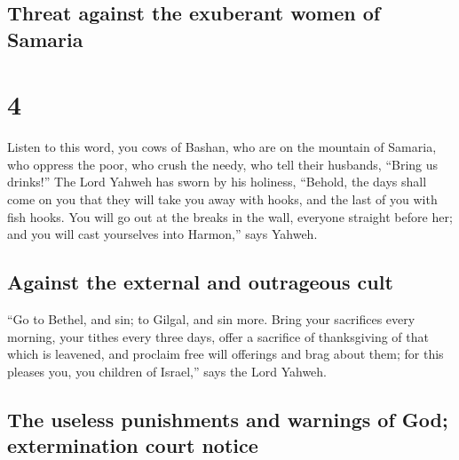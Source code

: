 \hypertarget{threat-against-the-exuberant-women-of-samaria}{%
\subsection{Threat against the exuberant women of
Samaria}\label{threat-against-the-exuberant-women-of-samaria}}

\hypertarget{section-3}{%
\section{4}\label{section-3}}

 Listen to this word, you cows of Bashan, who are on the
mountain of Samaria, who oppress the poor, who crush the needy, who tell
their husbands, ``Bring us drinks!''  The Lord Yahweh has
sworn by his holiness, ``Behold, the days shall come on you that they
will take you away with hooks, and the last of you with fish hooks.
 You will go out at the breaks in the wall, everyone
straight before her; and you will cast yourselves into Harmon,'' says
Yahweh.

\hypertarget{against-the-external-and-outrageous-cult}{%
\subsection{Against the external and outrageous
cult}\label{against-the-external-and-outrageous-cult}}

 ``Go to Bethel, and sin; to Gilgal, and sin more. Bring
your sacrifices every morning, your tithes every three days,
 offer a sacrifice of thanksgiving of that which is
leavened, and proclaim free will offerings and brag about them; for this
pleases you, you children of Israel,'' says the Lord Yahweh.

\hypertarget{the-useless-punishments-and-warnings-of-god-extermination-court-notice}{%
\subsection{The useless punishments and warnings of God; extermination
court
notice}\label{the-useless-punishments-and-warnings-of-god-extermination-court-notice}}


